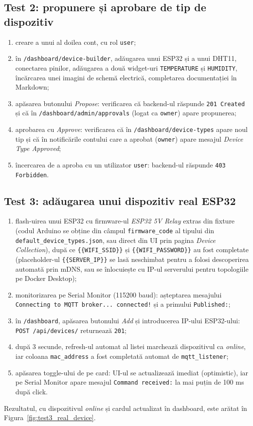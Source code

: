 \subsection{Test 2: propunere și aprobare de tip de dispozitiv}
\begin{enumerate}
    \item creare a unui al doilea cont, cu rol \texttt{user};
    \item în \texttt{/dashboard/device-builder}, adăugarea unui ESP32 și a unui DHT11, conectarea pinilor, adăugarea a două widget-uri \texttt{TEMPERATURE} și \texttt{HUMIDITY}, încărcarea unei imagini de schemă electrică, completarea documentației în Markdown;
    \item apăsarea butonului \emph{Propose}: verificarea că backend-ul răspunde \texttt{201 Created} și că în \texttt{/dashboard/admin/approvals} (logat ca \texttt{owner}) apare propunerea;
    \item aprobarea cu \emph{Approve}: verificarea că în \texttt{/dashboard/device-types} apare noul tip și că în notificările contului care a aprobat (\texttt{owner}) apare mesajul \emph{Device Type Approved};
    \item încercarea de a aproba cu un utilizator \texttt{user}: backend-ul răspunde \texttt{403 Forbidden}.
\end{enumerate}

\subsection{Test 3: adăugarea unui dispozitiv real ESP32}
\begin{enumerate}
    \item flash-uirea unui ESP32 cu firmware-ul \emph{ESP32 5V Relay} extras din fixture (codul Arduino se obține din câmpul \texttt{firmware\_code} al tipului din \texttt{default\_device\_types.json}, sau direct din UI prin pagina \emph{Device Collection}), după ce \texttt{\{\{WIFI\_SSID\}\}} și \texttt{\{\{WIFI\_PASSWORD\}\}} au fost completate (placeholder-ul \texttt{\{\{SERVER\_IP\}\}} se lasă neschimbat pentru a folosi descoperirea automată prin mDNS, sau se înlocuiește cu IP-ul serverului pentru topologiile pe Docker Desktop);
    \item monitorizarea pe Serial Monitor (115200 baud): așteptarea mesajului \texttt{Connecting to MQTT broker... connected!} și a primului \texttt{Published:};
    \item în \texttt{/dashboard}, apăsarea butonului \emph{Add} și introducerea IP-ului ESP32-ului: \texttt{POST /api/devices/} returnează \texttt{201};
    \item după 3 secunde, refresh-ul automat al listei marchează dispozitivul ca \emph{online}, iar coloana \texttt{mac\_address} a fost completată automat de \texttt{mqtt\_listener};
    \item apăsarea toggle-ului de pe card: UI-ul se actualizează imediat (optimistic), iar pe Serial Monitor apare mesajul \texttt{Command received:} la mai puțin de 100 ms după click.
\end{enumerate}
Rezultatul, cu dispozitivul \emph{online} și cardul actualizat în dashboard, este arătat în Figura~\ref{fig:test3_real_device}.

